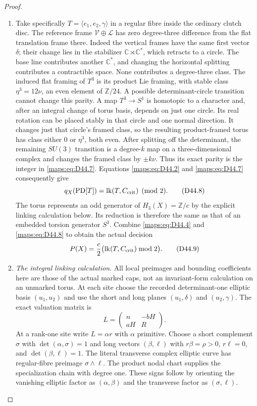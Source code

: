 \begin{proof}
\begin{enumerate}[label=\arabic*.,leftmargin=*]
\item Take specifically $T=\langle e_1,e_2,\gamma\rangle$ in a regular
fibre inside the ordinary clutch disc. The reference frame
$\mathcal V\oplus\mathcal L$ has zero degree-three difference
from the flat translation frame there. Indeed the vertical
frames have the same first vector $\delta$; their change lies
in the stabilizer $\mathbb C\rtimes\mathbb C^*$, which retracts
to a circle. The base line contributes another $\mathbb C^*$,
and changing the horizontal splitting contributes a contractible
space. None contributes a degree-three class. The induced flat
framing of $T^3$ is its product Lie framing, with stable class
$\eta^3=12\nu$, an even element of $\mathbb Z/24$.
A possible determinant-circle transition cannot change this
parity. A map $T^3\to S^1$ is homotopic to a character and,
after an integral change of torus basis, depends on just one
circle. Its real rotation can be placed stably in that circle
and one normal direction. It changes just that circle's framed
class, so the resulting product-framed torus has class either
$0$ or $\eta^3$, both even. After splitting off the determinant,
the remaining $SU(3)$ transition is a degree-$k$ map on a
three-dimensional complex and changes the framed class by
$\pm k\nu$. Thus its exact parity is the integer in \eqref{maps:eq:D44.7}.
Equations \eqref{maps:eq:D44.2} and \eqref{maps:eq:D44.7} consequently give
\[
 q_X(\operatorname{PD}[T])
       =\operatorname{lk}(T,C_{\rm crit})\pmod2.              \tag{D44.8}\label{maps:eq:D44.8}
\]
The torus represents an odd generator of $H_3(X)=\mathbb Z/c$
by the explicit linking calculation below. Its reduction is
therefore the same as that of an embedded torsion generator
$S^3$. Combine \eqref{maps:eq:D44.4} and \eqref{maps:eq:D44.8} to obtain the actual decision
\[
 P(X)=\frac c2
       \bigl(\operatorname{lk}(T,C_{\rm crit})\bmod2\bigr).
                                                               \tag{D44.9}\label{maps:eq:D44.9}
\]

\item \emph{The integral linking calculation.}
All local preimages and bounding coefficients here are those
of the actual marked caps, not an invariant-form calculation
on an unmarked torus. At each site choose the recorded
determinant-one elliptic basis $(u_1,u_2)$ and use the short
and long planes $(u_1,\delta)$ and $(u_2,\gamma)$. The exact
valuation matrix is
\[
 L=\begin{pmatrix}n&-bH\\aH&R\end{pmatrix}.                  \tag{D44.10}\label{maps:eq:D44.10}
\]
At a rank-one site write $L=\alpha r$ with $\alpha$ primitive.
Choose a short complement $\sigma$ with
$\det(\alpha,\sigma)=1$ and long vectors $(\beta,\ell)$ with
$r\beta=\rho>0$, $r\ell=0$, and $\det(\beta,\ell)=1$.
The literal transverse complex elliptic curve has regular-fibre
preimage $\sigma\wedge\ell$. The product nodal chart supplies
the specialization chain with degree one. These signs follow
by orienting the vanishing elliptic factor as $(\alpha,\beta)$
and the transverse factor as $(\sigma,\ell)$.


\end{enumerate}
\end{proof}
